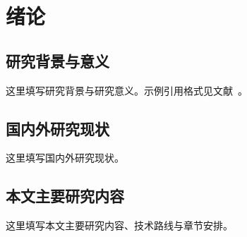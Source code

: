\chapter{绪论}

\section{研究背景与意义}

这里填写研究背景与研究意义。示例引用格式见文献~\cite{sample2026}。

\section{国内外研究现状}

这里填写国内外研究现状。

\section{本文主要研究内容}

这里填写本文主要研究内容、技术路线与章节安排。
